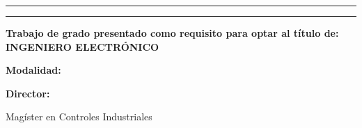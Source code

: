 \begin{titlepage}
\centering
\thispagestyle{empty}

\vspace*{0.5cm}
\rule{\textwidth}{1pt}
\vspace{0.3cm}

{\large\bfseries \MakeUppercase{\TituloTrabajo}\par}

\vspace{0.3cm}
\rule{\textwidth}{1pt}

\vspace{2cm}


\begin{flushleft}
{\bfseries Trabajo de grado presentado como requisito para optar al título de:\\[0.3cm]
INGENIERO ELECTRÓNICO\par}
\end{flushleft}

\vspace{0.8cm}

\begin{flushleft}
{\bfseries Modalidad:\par}
{\normalsize \ModalidadGrado\par}
\end{flushleft}

\vspace{0.8cm}

\begin{flushleft}
{\bfseries Director:\par}
{\normalsize \DirectorTrabajo\par}
{\small Magíster en Controles Industriales\par}
\end{flushleft}

\vfill


\end{titlepage}

